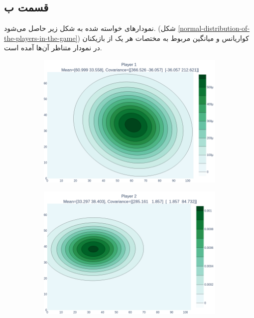 \documentclass[14pt,a4]{article}
\begin{document}
\subsection*{قسمت ب}

نمودار‌های خواسته شده به شکل زیر حاصل می‌شود. (شکل \ref{normal-distribution-of-the-players-in-the-game})
کواریانس و میانگین مربوط به مختصات هر یک از بازیکنان در نمودار متناظر آن‌ها آمده است.

\begin{figure}[h]
    \centering
    \begin{subfigure}{0.3\linewidth}
        \centering
        \includegraphics[scale=0.1]{images/q6/partb/1.png}
    \end{subfigure}
    \hfill
    \begin{subfigure}{0.3\linewidth}
        \centering
        \includegraphics[scale=0.1]{images/q6/partb/2.png}

\end{subfigure}
\end{figure}
\end{document}
